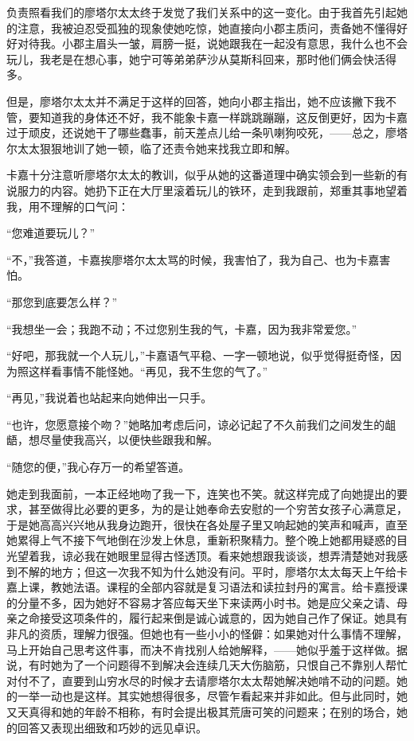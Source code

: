 \documentclass[12pt, UTF8]{ctexbook}
\begin{document}
\par 负责照看我们的廖塔尔太太终于发觉了我们关系中的这一变化。由于我首先引起她的注意，我被迫忍受孤独的现象使她吃惊，她直接向小郡主质问，责备她不懂得好好对待我。小郡主眉头一皱，肩膀一挺，说她跟我在一起没有意思，我什么也不会玩儿，我老是在想心事，她宁可等弟弟萨沙从莫斯科回来，那时他们俩会快活得多。
\par 但是，廖塔尔太太并不满足于这样的回答，她向小郡主指出，她不应该撇下我不管，要知道我的身体还不好，我不能象卡嘉一样跳跳蹦蹦，这反倒更好，因为卡嘉过于顽皮，还说她干了哪些蠢事，前天差点儿给一条叭喇狗咬死，——总之，廖塔尔太太狠狠地训了她一顿，临了还责令她来找我立即和解。
\par 卡嘉十分注意听廖塔尔太太的教训，似乎从她的这番道理中确实领会到一些新的有说服力的内容。她扔下正在大厅里滚着玩儿的铁环，走到我跟前，郑重其事地望着我，用不理解的口气问：
\par “您难道要玩儿？”
\par “不，”我答道，卡嘉挨廖塔尔太太骂的时候，我害怕了，我为自己、也为卡嘉害怕。
\par “那您到底要怎么样？”
\par “我想坐一会；我跑不动；不过您别生我的气，卡嘉，因为我非常爱您。”
\par “好吧，那我就一个人玩儿，”卡嘉语气平稳、一字一顿地说，似乎觉得挺奇怪，因为照这样看事情不能怪她。“再见，我不生您的气了。”
\par “再见，”我说着也站起来向她伸出一只手。
\par “也许，您愿意接个吻？”她略加考虑后问，谅必记起了不久前我们之间发生的龃龉，想尽量使我高兴，以便快些跟我和解。
\par “随您的便，”我心存万一的希望答道。
\par 她走到我面前，一本正经地吻了我一下，连笑也不笑。就这样完成了向她提出的要求，甚至做得比必要的更多，为的是让她奉命去安慰的一个穷苦女孩子心满意足，于是她高高兴兴地从我身边跑开，很快在各处屋子里又响起她的笑声和喊声，直至她累得上气不接下气地倒在沙发上休息，重新积聚精力。整个晚上她都用疑惑的目光望着我，谅必我在她眼里显得古怪透顶。看来她想跟我谈谈，想弄清楚她对我感到不解的地方；但这一次我不知为什么她没有问。平时，廖塔尔太太每天上午给卡嘉上课，教她法语。课程的全部内容就是复习语法和读拉封丹的寓言。给卡嘉授课的分量不多，因为她好不容易才答应每天坐下来读两小时书。她是应父亲之请、母亲之命接受这项条件的，履行起来倒是诚心诚意的，因为她自己作了保证。她具有非凡的资质，理解力很强。但她也有一些小小的怪僻：如果她对什么事情不理解，马上开始自己思考这件事，而决不肯找别人给她解释，——她似乎羞于这样做。据说，有时她为了一个问题得不到解决会连续几天大伤脑筋，只恨自己不靠别人帮忙对付不了，直要到山穷水尽的时候才去请廖塔尔太太帮她解决她啃不动的问题。她的一举一动也是这样。其实她想得很多，尽管乍看起来并非如此。但与此同时，她又天真得和她的年龄不相称，有时会提出极其荒唐可笑的问题来；在别的场合，她的回答又表现出细致和巧妙的远见卓识。
\end{document}
